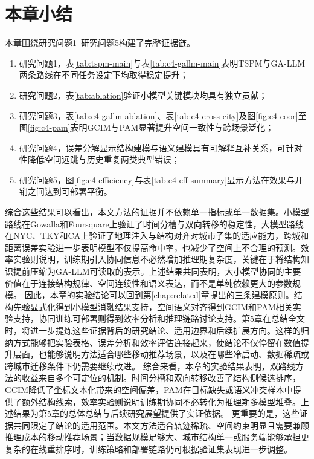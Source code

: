 \section{本章小结}
本章围绕研究问题1--研究问题5构建了完整证据链。
\begin{enumerate}
    \item 研究问题1，表\ref{tab:tspm-main}与表\ref{tab:c4-gallm-main}表明TSPM与GA-LLM两条路线在不同任务设定下均取得稳定提升；
    \item 研究问题2，表\ref{tab:ablation}验证小模型关键模块均具有独立贡献；
    \item 研究问题3，表\ref{tab:c4-gallm-ablation}、表\ref{tab:c4-cross-city}及图\ref{fig:c4-coor}至图\ref{fig:c4-pam}表明GCIM与PAM显著提升空间一致性与跨场景泛化；
    \item 研究问题4，误差分解显示结构建模与语义建模具有可解释互补关系，可针对性降低空间远跳与历史重复两类典型错误；
    \item 研究问题5，图\ref{fig:c4-efficiency}与表\ref{tab:c4-eff-summary}显示方法在效果与开销之间达到可部署平衡。
\end{enumerate}
\par\indent 综合这些结果可以看出，本文方法的证据并不依赖单一指标或单一数据集。小模型路线在Gowalla和Foursquare上验证了时间分槽与双向转移的稳定性，大模型路线在NYC、TKY和CA上验证了地理注入与结构对齐对城市子集的适应能力，跨城和距离误差实验进一步表明模型不仅提高命中率，也减少了空间上不合理的预测。效率实验则说明，训练期引入协同信息不必然增加推理期复杂度，关键在于将结构知识提前压缩为GA-LLM可读取的表示。上述结果共同表明，大小模型协同的主要价值在于连接结构规律、空间连续性和语义表达，而不是单纯依赖更大的参数规模。
因此，本章的实验结论可以回到第\ref{chap:related}章提出的三条建模原则。结构先验显式化得到小模型消融结果支持，空间语义对齐得到GCIM和PAM相关实验支持，协同训练可部署则得到效率分析和推理链路讨论支持。第5章在总结全文时，将进一步提炼这些证据背后的研究结论、适用边界和后续扩展方向。这样的归纳方式能够把实验表格、误差分析和效率评估连接起来，使结论不仅停留在数值提升层面，也能够说明方法适合哪些移动推荐场景，以及在哪些冷启动、数据稀疏或跨城市迁移条件下仍需要继续改进。
综合来看，本章的实验结果表明，双路线方法的收益来自多个可定位的机制。时间分槽和双向转移改善了结构侧候选排序，GCIM降低了坐标文本化带来的空间偏差，PAM在目标缺失或语义冲突样本中提供了额外结构线索，效率实验则说明训练期协同不必转化为推理期多模型堆叠。上述结果为第5章的总体总结与后续研究展望提供了实证依据。
更重要的是，这些证据共同限定了结论的适用范围。本文方法适合轨迹稀疏、空间约束明显且需要兼顾推理成本的移动推荐场景；当数据规模足够大、城市结构单一或服务端能够承担更复杂的在线重排序时，训练策略和部署链路仍可根据验证集表现进一步调整。
